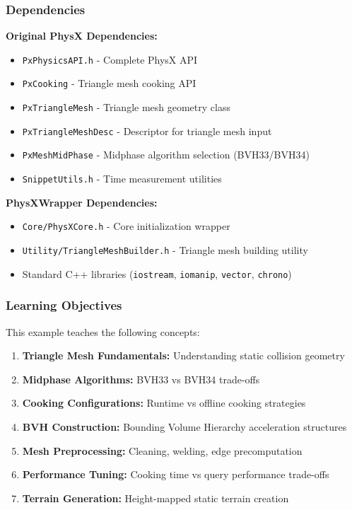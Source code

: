\subsubsection{Dependencies}

\textbf{Original PhysX Dependencies:}
\begin{itemize}
    \item \texttt{PxPhysicsAPI.h} - Complete PhysX API
    \item \texttt{PxCooking} - Triangle mesh cooking API
    \item \texttt{PxTriangleMesh} - Triangle mesh geometry class
    \item \texttt{PxTriangleMeshDesc} - Descriptor for triangle mesh input
    \item \texttt{PxMeshMidPhase} - Midphase algorithm selection (BVH33/BVH34)
    \item \texttt{SnippetUtils.h} - Time measurement utilities
\end{itemize}

\textbf{PhysXWrapper Dependencies:}
\begin{itemize}
    \item \texttt{Core/PhysXCore.h} - Core initialization wrapper
    \item \texttt{Utility/TriangleMeshBuilder.h} - Triangle mesh building utility
    \item Standard C++ libraries (\texttt{iostream}, \texttt{iomanip}, \texttt{vector}, \texttt{chrono})
\end{itemize}

\subsubsection{Learning Objectives}

This example teaches the following concepts:
\begin{enumerate}
    \item \textbf{Triangle Mesh Fundamentals:} Understanding static collision geometry
    \item \textbf{Midphase Algorithms:} BVH33 vs BVH34 trade-offs
    \item \textbf{Cooking Configurations:} Runtime vs offline cooking strategies
    \item \textbf{BVH Construction:} Bounding Volume Hierarchy acceleration structures
    \item \textbf{Mesh Preprocessing:} Cleaning, welding, edge precomputation
    \item \textbf{Performance Tuning:} Cooking time vs query performance trade-offs
    \item \textbf{Terrain Generation:} Height-mapped static terrain creation
\end{enumerate}

